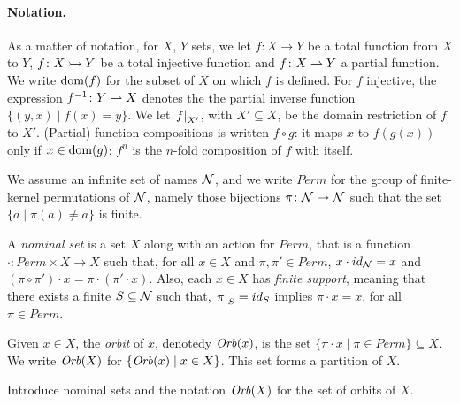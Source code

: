 \paragraph{Notation.} As a matter of notation, for $X$, $Y$ sets, we let $f \colon X \to Y$ be a total function from $X$ to $Y$, $f \colon X \rightarrowtail Y$ be a total injective function and $f \colon X \rightharpoonup Y$ a partial function. We write $\operatorname{dom}(f)$ for the subset of $X$ on which $f$ is defined. For $f$ injective, the expression $f^{-1} \colon Y \rightharpoonup X$ denotes the the partial inverse function $\{(y,x) \mid f(x) = y \}$. We let $\left.f\right|_{X'}$, with $X' \subseteq X$, be the domain restriction of $f$ to $X'$. (Partial) function compositions is written $f \circ g$: it maps $x$ to $f(g(x))$ only if $x \in \operatorname{dom}(g)$; $f^n$ is the $n$-fold composition of $f$ with itself.

We assume an infinite set of names $\mathcal{N}$, and we write $Perm$ for the group of finite-kernel permutations of $\mathcal{N}$, namely those bijections $\pi \colon \mathcal{N} \to \mathcal{N}$ such that the set $\{ a \mid \pi(a) \neq a \}$ is finite.
\begin{definition}
A \emph{nominal set} is a set $X$ along with an action for $Perm$, that is a function $\cdot \colon Perm \times X \to X$ such that, for all $x \in X$ and $\pi,\pi' \in Perm$, $x \cdot id_{\mathcal{N}} = x$ and $(\pi \circ \pi') \cdot x = \pi \cdot (\pi' \cdot x)$. Also, each $x \in X$ has \emph{finite support}, meaning that there exists a finite $S \subseteq \mathcal{N}$ such that, $\left.\pi\right|_{S} = id_S$ implies $\pi \cdot x = x$, for all $\pi \in Perm$.
\end{definition}
%
Given $x \in X$, the \emph{orbit} of $x$, denotedy $\mathit{Orb}(x) $, is the set $\{ \pi \cdot x \mid \pi \in Perm\} \subseteq X$. We write $\mathit{Orb}(X)$ for $\{ \mathit{Orb}(x) \mid x \in X\}$. This set forms a partition of $X$. 
\begin{Todo}
 Introduce nominal sets and the notation $\mathit{Orb}(X)$ for the set of orbits of $X$.
\end{Todo}
